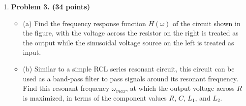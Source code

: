 \begin{enumerate}




\item {\bf Problem 3. (34 points)} 

  \begin{itemize}
  \item (a) Find the frequency response function $H(\omega)$ of the circuit 
    shown in the figure, with the voltage across the resistor on the right 
    is treated as the output while the sinusoidal voltage source on the left 
    is treated as input.

  \item (b) Similar to a simple RCL series resonant circuit, this circuit
    can be used as a band-pass filter to pass signals around its resonant 
    frequency. Find this resonant frequency $\omega_{max}$, at which the 
    output voltage across $R$ is maximized, in terms of the component values 
    $R$, $C$, $L_1$, and $L_2$. 


\end{itemize}
\end{enumerate}
